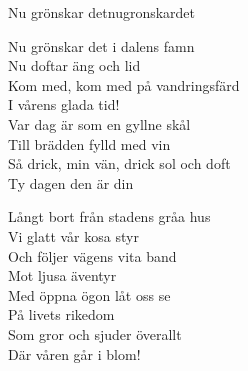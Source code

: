 \begin{song}{Nu grönskar det}{nugronskardet}
\begin{vers}
Nu grönskar det i dalens famn\\
Nu doftar äng och lid\\
Kom med, kom med på vandringsfärd\\
I vårens glada tid!\\
Var dag är som en gyllne skål\\
Till brädden fylld med vin\\
Så drick, min vän, drick sol och doft\\
Ty dagen den är din\\
\end{vers}
\begin{vers}
Långt bort från stadens gråa hus \\
Vi glatt vår kosa styr\\
Och följer vägens vita band\\
Mot ljusa äventyr\\
Med öppna ögon låt oss se\\
På livets rikedom\\
Som gror och sjuder överallt\\
Där våren går i blom!\\
\end{vers}
\end{song}

